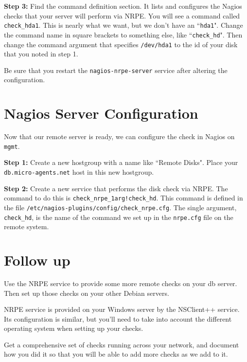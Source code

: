 \documentclass{article}   	%
\begin{document}
\textbf{Step 3:} Find the command definition section.  It lists and configures the Nagios checks that your server will perform via NRPE.  You will see a command called \texttt{check\_hda1}.  This is nearly what we want, but we don't have an ``\texttt{hda1}".  Change the command name in square brackets to something else, like ``\texttt{check\_hd}".  Then change the command argument that specifies \texttt{/dev/hda1} to the id of your disk that you noted in step 1.

Be sure that you restart the \texttt{nagios-nrpe-server} service after altering the configuration.

\section{Nagios Server Configuration}
Now that our remote server is ready, we can configure the check in Nagios on \texttt{mgmt}.

\textbf{Step 1:} Create a new hostgroup with a name like ``Remote Disks".  Place your \texttt{db.micro-agents.net} host in this new hostgroup.

\textbf{Step 2:}  Create a new service that performs the disk check via NRPE.  The command to do this is \texttt{check\_nrpe\_1arg!check\_hd}.  This command is defined in the file \texttt{/etc/nagios-plugins/config/check\_nrpe.cfg}.  The single argument, \texttt{check\_hd}, is the name of the command we set up in the \texttt{nrpe.cfg} file on the remote system.

\section{Follow up}
Use the NRPE service to provide some more remote checks on your db server.  Then set up those checks on your other Debian servers.

NRPE service is provided on your Windows server by the NSClient++ service.  Its configuration is similar, but you'll need to take into account the different operating system when setting up your checks.

Get a comprehensive set of checks running across your network, and document how you did it so that you will be able to add more checks as we add to it.
\end{document}
